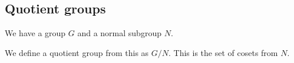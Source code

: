 
\subsection{Quotient groups}

We have a group \(G\) and a normal subgroup \(N\).

We define a quotient group from this as \(G/N\). This is the set of cosets from \(N\).

